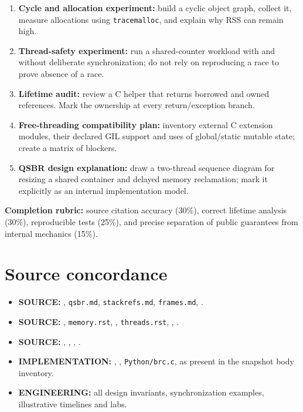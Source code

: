\documentclass[
  11pt,
]{report}
\newcommand{\passthrough}[1]{#1}
\providecommand{\tightlist}{%
  \setlength{\itemsep}{0pt}\setlength{\parskip}{0pt}}
\begin{document}
\begin{enumerate}
\def\labelenumi{\arabic{enumi}.}
\tightlist
\item
  \textbf{Cycle and allocation experiment:} build a cyclic object graph,
  collect it, measure allocations using
  \passthrough{\lstinline!tracemalloc!}, and explain why RSS can remain
  high.
\item
  \textbf{Thread-safety experiment:} run a shared-counter workload with
  and without deliberate synchronization; do not rely on reproducing a
  race to prove absence of a race.
\item
  \textbf{Lifetime audit:} review a C helper that returns borrowed and
  owned references. Mark the ownership at every return/exception branch.
\item
  \textbf{Free-threading compatibility plan:} inventory external C
  extension modules, their declared GIL support and uses of
  global/static mutable state; create a matrix of blockers.
\item
  \textbf{QSBR design explanation:} draw a two-thread sequence diagram
  for resizing a shared container and delayed memory reclamation; mark
  it explicitly as an internal implementation model.
\end{enumerate}

\textbf{Completion rubric:} source citation accuracy (30\%), correct
lifetime analysis (30\%), reproducible tests (25\%), and precise
separation of public guarantees from internal mechanics (15\%).

\chapter{Source concordance}\label{source-concordance}

\begin{itemize}
\tightlist
\item
  \textbf{SOURCE:}
  ,
  \passthrough{\lstinline!qsbr.md!},
  \passthrough{\lstinline!stackrefs.md!},
  \passthrough{\lstinline!frames.md!},
  .
\item
  \textbf{SOURCE:} ,
  \passthrough{\lstinline!memory.rst!},
  ,
  \passthrough{\lstinline!threads.rst!},
  ,
  .
\item
  \textbf{SOURCE:}
  ,
  ,
  ,
  .
\item
  \textbf{IMPLEMENTATION:} ,
  ,
  \passthrough{\lstinline!Python/brc.c!},
   as present
  in the snapshot body inventory.
\item
  \textbf{ENGINEERING:} all design invariants, synchronization examples,
  illustrative timelines and labs.
\end{itemize}
\end{document}
